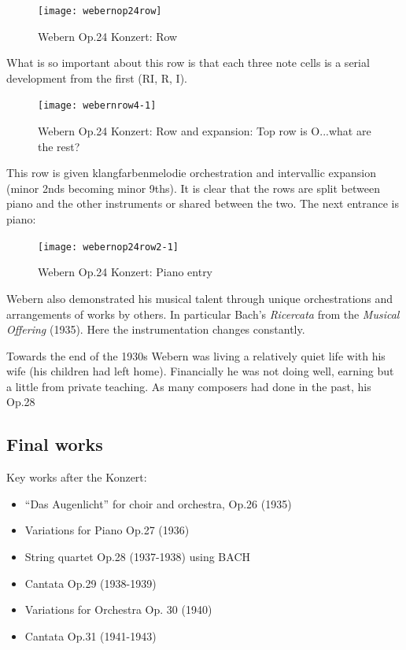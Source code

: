 \begin{figure}[H]
\centering
\texttt{[image: webernop24row]}\caption{Webern Op.24 Konzert: Row}
\label{fig:op24row}
\end{figure}

What is so important about this row is that each three note cells is a serial development from the first (RI, R, I).

\begin{figure}[H]
\centering
\texttt{[image: webernrow4-1]}\caption{Webern Op.24 Konzert: Row and expansion: Top row is O...what are the rest?}
\label{fig:op24row2}
\end{figure}

This row is given klangfarbenmelodie orchestration and intervallic expansion (minor 2nds becoming minor 9ths). It is clear that the rows are split between piano and the other instruments or shared between the two. The next entrance is piano:

\begin{figure}[H]
\centering
\texttt{[image: webernop24row2-1]}\caption{Webern Op.24 Konzert: Piano entry}
\label{fig:op24row}
\end{figure}




Webern also demonstrated his musical talent through unique orchestrations and arrangements of works by others. In particular Bach's \textit{Ricercata} from the \textit{Musical Offering} (1935). Here the instrumentation changes constantly. 

Towards the end of the 1930s Webern was living a relatively quiet life with his wife (his children had left home). Financially he was not doing well, earning but a little from private teaching. As many composers had done in the past, his Op.28 

\subsection{Final works}
Key works after the Konzert:
\begin{itemize}
\item ``Das Augenlicht'' for choir and orchestra, Op.26 (1935)
\item Variations for Piano Op.27 (1936)
\item String quartet Op.28 (1937-1938) using BACH
\item Cantata Op.29 (1938-1939)
\item Variations for Orchestra Op. 30 (1940)
\item Cantata Op.31 (1941-1943)
\end{itemize}

